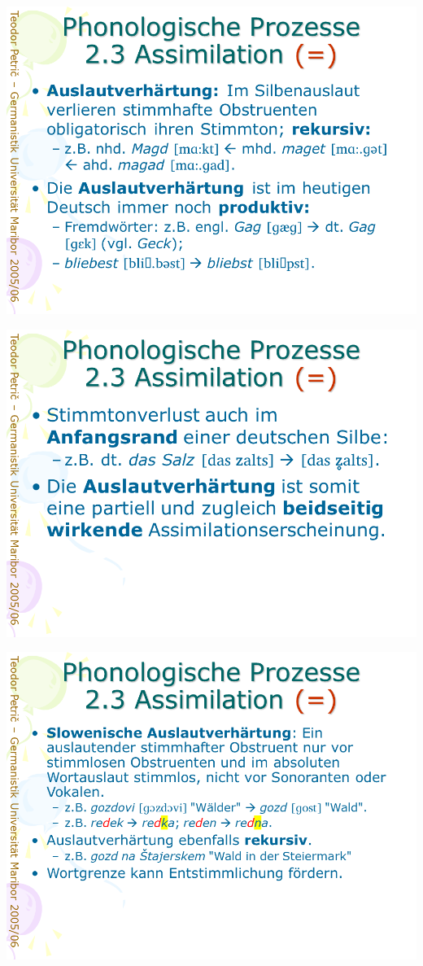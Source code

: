 \documentclass[
  letterpaper,
]{scrbook}
\begin{document}
\includegraphics[width=1\textwidth,height=\textheight]{./pictures/prozesse/prozesse_33.PNG}

\includegraphics[width=1\textwidth,height=\textheight]{./pictures/prozesse/prozesse_34.PNG}

\includegraphics[width=1\textwidth,height=\textheight]{./pictures/prozesse/prozesse_35.PNG}
\end{document}
